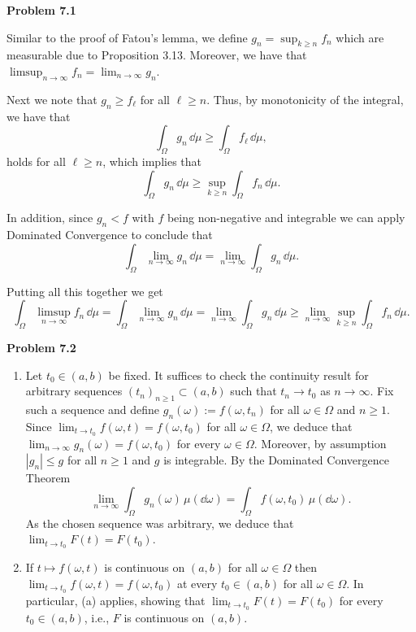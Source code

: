    
\textbf{Problem 7.1}

Similar to the proof of Fatou's lemma, we define $g_n = \sup_{k \ge n} f_n$ which are measurable due to Proposition 3.13. Moreover, we have that $\limsup_{n \to \infty} f_n = \lim_{n \to \infty} g_n$.

Next we note that $g_n \ge f_\ell$ for all $\ell \ge n$. Thus, by monotonicity of the integral, we have that
\[
	\int_\Omega g_n \, \dd \mu \ge \int_\Omega f_\ell \, \dd \mu,
\]
holds for all $\ell \ge n$, which implies that
\[
	\int_\Omega g_n \, \dd \mu \ge \sup_{k \ge n} \int_\Omega f_n \, \dd \mu.
\]

In addition, since $g_n < f$ with $f$ being non-negative and integrable we can apply Dominated Convergence to conclude that
\[
	\int_\Omega \lim_{n \to \infty} g_n \, \dd \mu = \lim_{n \to \infty} \int_\Omega g_n \, \dd \mu.
\]

Putting all this together we get
\[
	\int_\Omega \limsup_{n \to \infty} f_n \, \dd \mu
	= \int_\Omega \lim_{n \to \infty} g_n \, \dd \mu = \lim_{n \to \infty} \int_\Omega g_n \, \dd \mu \ge \lim_{n \to \infty} \sup_{k \ge n} \int_\Omega f_n \, \dd \mu.
\]

\bigskip

\textbf{Problem 7.2}

\begin{enumerate}[label={(\alph*)}]
	\item Let $t_0\in (a,b)$ be fixed. It suffices to check the continuity result for arbitrary sequences $(t_n)_{n\ge 1} \subset (a, b)$ such that $t_n\to t_0$ as $n\to\infty$. Fix such a sequence and define $g_n(\omega):= f(\omega,t_n)$ for all $\omega\in\Omega$ and $n\ge 1$. Since $\lim_{t\to t_0}f(\omega,t)=f(\omega,t_0)$ for all $\omega\in\Omega$, we deduce that $\lim_{n\to\infty} g_n(\omega) = f(\omega,t_0)$ for every $\omega\in\Omega$. Moreover, by assumption $|g_n| \le g$ for all $n \ge 1$ and $g$ is integrable. By the Dominated Convergence Theorem
\[
	\lim_{n\to\infty} \int_\Omega g_n(\omega)\,\mu(\dd\omega) = \int_\Omega f(\omega,t_0)\,\mu(\dd\omega).
\]
As the chosen sequence was arbitrary, we deduce that $\lim_{t\to t_0} F(t) = F(t_0)$.

	\item If $t\mapsto f(\omega,t)$ is continuous on $(a, b)$ for all $\omega\in\Omega$ then $\lim_{t\to t_0}f(\omega,t)=f(\omega,t_0)$ at every $t_0\in(a,b)$ for all $\omega\in\Omega$. In particular, (a) applies, showing that $\lim_{t\to t_0} F(t) = F(t_0)$ for every $t_0\in (a,b)$, i.e., $F$ is continuous on $(a, b)$.
\end{enumerate}

